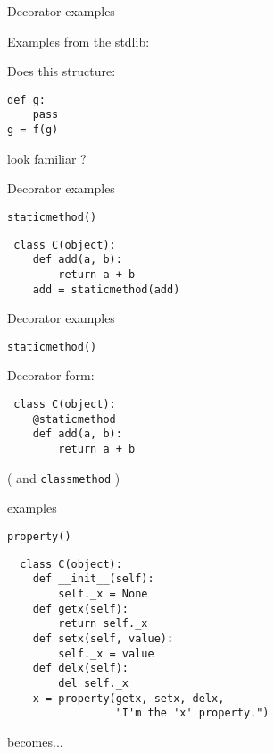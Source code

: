 \documentclass{beamer}
\begin{document}
\begin{frame}[fragile]{Decorator  examples}

{\LARGE Examples from the stdlib:}

\vfill
{\Large Does this structure:}

\vfill
\begin{verbatim}
def g:
    pass
g = f(g)
\end{verbatim}

\vfill

{\Large look familiar ?}
\end{frame} 

\begin{frame}[fragile]{Decorator examples}

{\LARGE \verb|staticmethod()|}

\vfill
\begin{verbatim}
￼class C(object):
    def add(a, b):
        return a + b
    add = staticmethod(add)
\end{verbatim}

\vfill

\end{frame} 

\begin{frame}[fragile]{Decorator examples}

{\LARGE \verb|staticmethod()|}

\vfill
{\Large Decorator form:}
\begin{verbatim}
￼class C(object):
    @staticmethod
    def add(a, b):
        return a + b
\end{verbatim}

\vfill

{\LARGE ( and \verb|classmethod| )}
\end{frame} 

\begin{frame}[fragile]{examples}

{\LARGE \verb|property()|}

\vfill
\begin{verbatim}
￼￼class C(object):
    def __init__(self):
        self._x = None
    def getx(self):
        return self._x
    def setx(self, value):
        self._x = value
    def delx(self):
        del self._x
    x = property(getx, setx, delx,
                 "I'm the 'x' property.")
\end{verbatim}

\vfill
becomes...
\end{frame} 
\end{document}
